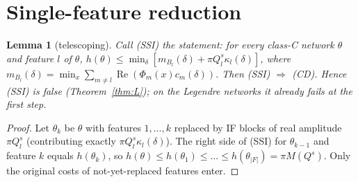 \documentclass[11pt]{article}
\newtheorem{lemma}[theorem]{Lemma}
\theoremstyle{remark}
\newcommand{\Re}{\operatorname{Re}}
\renewcommand{\Re}{\operatorname{Re}}
\begin{document}
\section{Single-feature reduction}
\begin{lemma}[telescoping]\label{lem:T}
Call (SSI) the statement: for every class-C network $\theta$ and feature $l$ of $\theta$,
$h(\theta)\le\min_\delta[m_{B_l}(\delta)+\pi Q_l^s\kappa_l(\delta)]$, where $m_{B_l}(\delta)=\min_x\sum_{m\ne l}\Re(\Phi_m(x)c_m(\delta))$.
Then (SSI) $\Rightarrow$ (CD).  Hence (SSI) is false (Theorem~\ref{thm:L}); on the Legendre networks it already fails at the first step.
\end{lemma}
\begin{proof}
Let $\theta_k$ be $\theta$ with features $1,\dots,k$ replaced by IF blocks of real amplitude $\pi Q_l^s$ (contributing exactly
$\pi Q_l^s\kappa_l(\delta)$).  The right side of (SSI) for $\theta_{k-1}$ and feature $k$ equals $h(\theta_k)$, so
$h(\theta)\le h(\theta_1)\le\dots\le h(\theta_{|F|})=\pi M(Q^s)$.  Only the original costs of not-yet-replaced features enter.
\end{proof}
\end{document}

